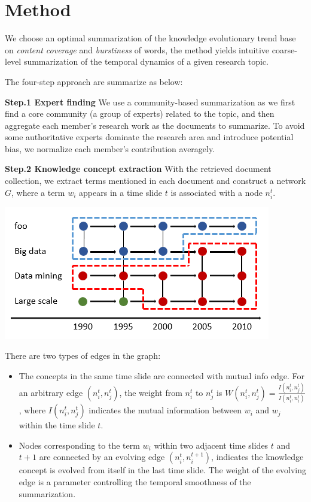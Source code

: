 \section{Method}
\label{sec:problem}

We choose an optimal summarization of the knowledge evolutionary trend base on \emph{content coverage} and \emph{ burstiness} of words, the method yields intuitive coarse-level summarization of the temporal dynamics of a given research topic.

The four-step approach are summarize as below:

\textbf{Step.1 Expert finding}
We use a community-based summarization as we first find a core community (a group of experts) related to the topic, and then aggregate each member's research work as the documents to summarize. To avoid some authoritative experts dominate the research area and introduce potential bias, we normalize each member's contribution averagely.

\textbf{Step.2 Knowledge concept extraction}
With the retrieved document collection, we extract terms mentioned in each document and construct a network $G$, where a term $w_i$ appears in a time slide $t$ is associated with a node $n_i^t$.
\begin{center}
\includegraphics[width=0.80\linewidth]{figures/mutual.png}
\end{center}
There are two types of edges in the graph:

\begin{itemize}	
\item The concepts in the same time slide are connected with mutual info edge. For an arbitrary edge $(n_i^t, n_j^t)$, the weight from $n_i^t$ to $n_j^t$ is $W(n_i^t,n_j^t) = \frac{I(n_i^t,n_j^t)}{I(n_i^t,n_i^t)}$, where $I(n_i^t,n_j^t)$ indicates the mutual information between $w_i$ and $w_j$ within the time slide $t$.
\item Nodes corresponding to the term $w_i$ within two adjacent time slides $t$ and $t+1$ are connected by an evolving edge $(n_i^t,n_i^{t+1})$, indicates the knowledge concept is evolved from itself in the last time slide. The weight of the evolving edge is a parameter controlling the temporal smoothness of the summarization.
\end{itemize}


